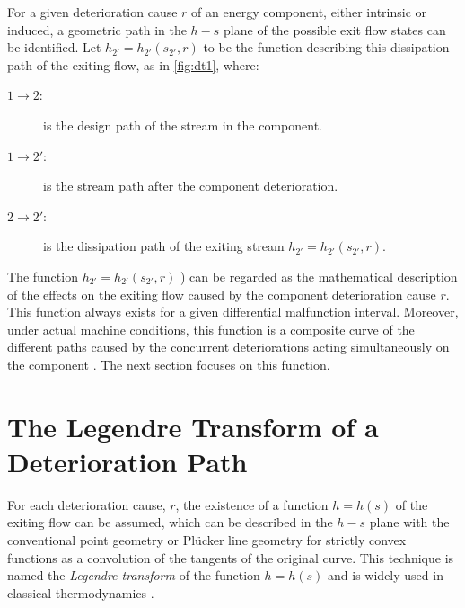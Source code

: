 \documentclass[energies,article,submit,moreauthors,pdftex]{Definitions/mdpi}
\begin{document}
For a given deterioration cause $r$ of an energy component, either intrinsic or induced, a geometric path in the $h-s$ plane of the possible exit flow states can be identified. Let $h_{2'}=h_{2'}(s_{2'}, r)$ to be the function describing this dissipation path of the exiting flow, as in \cref{fig:dt1}, where:
\begin{description}
	\item[$1 \longrightarrow 2:$]  is the design path of the stream in the component.
	\item[$1 \longrightarrow 2':$] is the stream path after the component deterioration.
	\item[$2 \longrightarrow 2':$] is the dissipation path of the exiting stream $h_{2'} = h_{2'} (s_{2'}, r).$
\end{description}

The function $h_{2'}=h_{2'} (s_{2'}, r)$ ) can be regarded as the mathematical description of the effects on the exiting flow caused by the component deterioration cause $r$. This function always exists for a given differential malfunction interval. Moreover, under actual machine conditions, this function is a composite curve of the different paths caused by the concurrent deteriorations acting simultaneously on the component \cite{Valero2004c}. The next section focuses on this function.

\section{The Legendre Transform of a Deterioration Path}
For each deterioration cause, $r$, the existence of a function $h = h(s)$ of the exiting flow can be assumed, which can be described in the $h-s$ plane with the conventional point geometry or Plücker line geometry for strictly convex functions as a convolution of the tangents of the original curve. This technique is named the \emph{Legendre transform} of the function $h = h(s)$ and is widely used in classical thermodynamics \cite{Callen1985,Alberty2001}.
\end{document}
